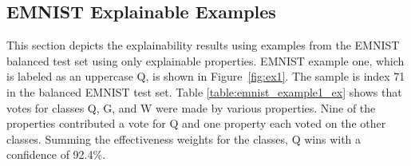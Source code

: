

\subsection{EMNIST Explainable Examples}

This section depicts the explainability results using examples from the EMNIST
balanced test set using only explainable properties.  EMNIST example one, which
is labeled as an uppercase Q, is shown in Figure~\ref{fig:ex1}.  The sample is
index 71 in the balanced EMNIST test set.  Table \ref{table:emnist_example1_ex}
shows that votes for classes Q, G, and W were made by various properties.  Nine
of the properties contributed a vote for Q and one property each voted on the
other classes.  Summing the effectiveness weights for the classes, Q wins with a
confidence of 92.4\%.


